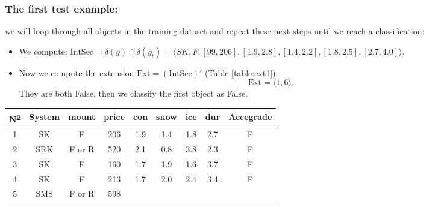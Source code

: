 \documentclass[12pt]{report}
\begin{document}
\begin{solution}
\begin{enumerate}
        \subsubsection*{The first test example:}
        \par 
        we will loop through all objects in the training dataset and repeat these next steps until we reach a classification:
        \begin{itemize}
            \item We compute: $\text{IntSec} = \delta (g) \cap \delta (g_t) = \langle SK, F, [99, 206], [1.9, 2.8], [1.4, 2.2], [1.8, 2.5], [2.7, 4.0] \rangle.$
            \item Now we compute the extension $\text{Ext} = \left(\text{IntSec}\right)'$ (Table \ref{table:ext1}):
            \[
                \text{Ext} = \langle 1, 6\rangle.
            \]
            They are both False, then we classify the first object as False.
        \end{itemize}
        \begin{table}[H]
            \centering
            \begin{tabular}{|c|c|c|c|c|c|c|c|c|}
            \hline
            N\textsuperscript{\underline{o}} &
              System &
              mount &
              price &
              con &
              snow &
              ice &
              dur &
              Accegrade \\ \hline
            \rowcolor[HTML]{34FF34} 
            1 &
              SK &
              F &
              206 &
              1.9 &
              1.4 &
              1.8 &
              2.7 &
              F \\ \hline
            2 &
              \cellcolor[HTML]{FE0000}SRK &
              \cellcolor[HTML]{FFFFFF}F or R &
              520 &
              2.1 &
              0.8 &
              3.8 &
              2.3 &
              F \\ \hline
            3 &
              SK &
              F &
              160 &
              \cellcolor[HTML]{FE0000}1.7 &
              1.9 &
              1.6 &
              3.7 &
              F \\ \hline
            4 &
              SK &
              F &
              \cellcolor[HTML]{FE0000}213 &
              1.7 &
              2.0 &
              2.4 &
              3.4 &
              F \\ \hline
            5 &
              \cellcolor[HTML]{FE0000}SMS &
              F or R &
              \cellcolor[HTML]{FFFFFF}598 &

\end{tabular}
\end{table}
\end{enumerate}
\end{solution}
\end{document}
